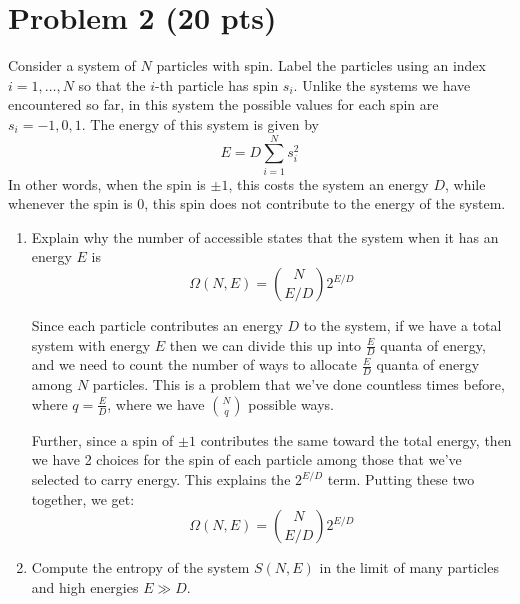 \documentclass[10pt]{article}
\begin{document}
	\section*{Problem 2 (20 pts)}
	Consider a system of $N$ particles with spin. Label the particles using an index $i = 1, \dots, N$ so 
	that the $i$-th particle has spin $s_i$. Unlike the systems we have encountered so far, in this system
	the possible values for each spin are $s_i = -1, 0, 1$. The energy of this system 
	is given by 
	\[
		E = D \sum_{i = 1}^N s_i^2
	\] 
	In other words, when the spin is $\pm 1$, this costs the system an energy $D$, while whenever 
	the spin is 0, this spin does not contribute to the energy of the system.
	\begin{enumerate}[label=\alph*)]
		\item Explain why the number of accessible states that the system when it has an energy $E$ is 
			\[
				\Omega(N, E) = {N \choose E/D} 2^{E / D}
			\] 
			\begin{solution}
				Since each particle contributes an energy $D$ to the system, if we have a total system 
				with energy $E$ then we can divide this up into $\frac{E}{D}$ quanta of energy, and we need 
				to count the number of ways to allocate $\frac{E}{D}$ quanta of energy among $N$ particles. This
				is a problem that we've done countless times before, where $q = \frac{E}{D}$, where we have 
				${N \choose q}$ possible ways. 

				Further, since a spin of $\pm 1$ contributes the same toward the total energy, then we have 
				2 choices for the spin of each particle among those that we've selected to carry 
				energy. This explains the $2^{E/D}$ term. Putting these two together, we get:
				\[
					\Omega(N, E) = {N \choose E / D} 2^{E / D}
				\] 
			\end{solution}
		\item Compute the entropy of the system $S(N, E)$ in the limit of many particles and high energies 
			$E \gg D$.


\end{enumerate}
\end{document}

